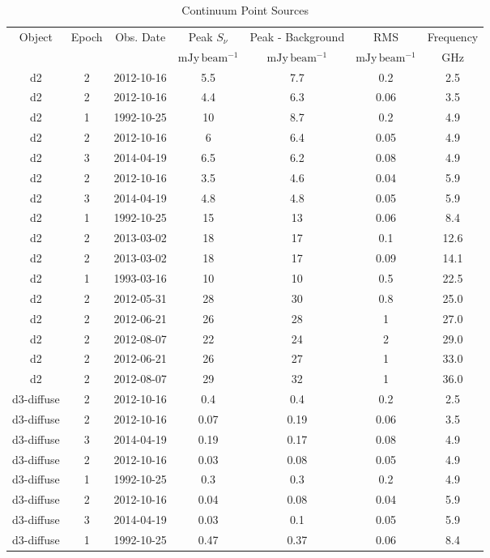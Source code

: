 \begin{longtable}{ccccccc}
\caption{Continuum Point Sources}\\

\label{tab:contsrcs_full}
Object & Epoch & Obs. Date & Peak $S_{\nu}$ & Peak - Background & RMS & Frequency \\
$\mathrm{}$ & $\mathrm{}$ & $\mathrm{}$ & $\mathrm{mJy\,beam^{-1}}$ & $\mathrm{mJy\,beam^{-1}}$ & $\mathrm{mJy\,beam^{-1}}$ & $\mathrm{GHz}$ \\
\hline
d2 & 2 & 2012-10-16 & 5.5 & 7.7 & 0.2 & 2.5 \\
d2 & 2 & 2012-10-16 & 4.4 & 6.3 & 0.06 & 3.5 \\
d2 & 1 & 1992-10-25 & 10 & 8.7 & 0.2 & 4.9 \\
d2 & 2 & 2012-10-16 & 6 & 6.4 & 0.05 & 4.9 \\
d2 & 3 & 2014-04-19 & 6.5 & 6.2 & 0.08 & 4.9 \\
d2 & 2 & 2012-10-16 & 3.5 & 4.6 & 0.04 & 5.9 \\
d2 & 3 & 2014-04-19 & 4.8 & 4.8 & 0.05 & 5.9 \\
d2 & 1 & 1992-10-25 & 15 & 13 & 0.06 & 8.4 \\
d2 & 2 & 2013-03-02 & 18 & 17 & 0.1 & 12.6 \\
d2 & 2 & 2013-03-02 & 18 & 17 & 0.09 & 14.1 \\
d2 & 1 & 1993-03-16 & 10 & 10 & 0.5 & 22.5 \\
d2 & 2 & 2012-05-31 & 28 & 30 & 0.8 & 25.0 \\
d2 & 2 & 2012-06-21 & 26 & 28 & 1 & 27.0 \\
d2 & 2 & 2012-08-07 & 22 & 24 & 2 & 29.0 \\
d2 & 2 & 2012-06-21 & 26 & 27 & 1 & 33.0 \\
d2 & 2 & 2012-08-07 & 29 & 32 & 1 & 36.0 \\
d3-diffuse & 2 & 2012-10-16 & 0.4 & 0.4 & 0.2 & 2.5 \\
d3-diffuse & 2 & 2012-10-16 & 0.07 & 0.19 & 0.06 & 3.5 \\
d3-diffuse & 3 & 2014-04-19 & 0.19 & 0.17 & 0.08 & 4.9 \\
d3-diffuse & 2 & 2012-10-16 & 0.03 & 0.08 & 0.05 & 4.9 \\
d3-diffuse & 1 & 1992-10-25 & 0.3 & 0.3 & 0.2 & 4.9 \\
d3-diffuse & 2 & 2012-10-16 & 0.04 & 0.08 & 0.04 & 5.9 \\
d3-diffuse & 3 & 2014-04-19 & 0.03 & 0.1 & 0.05 & 5.9 \\
d3-diffuse & 1 & 1992-10-25 & 0.47 & 0.37 & 0.06 & 8.4 \\

\end{longtable}
